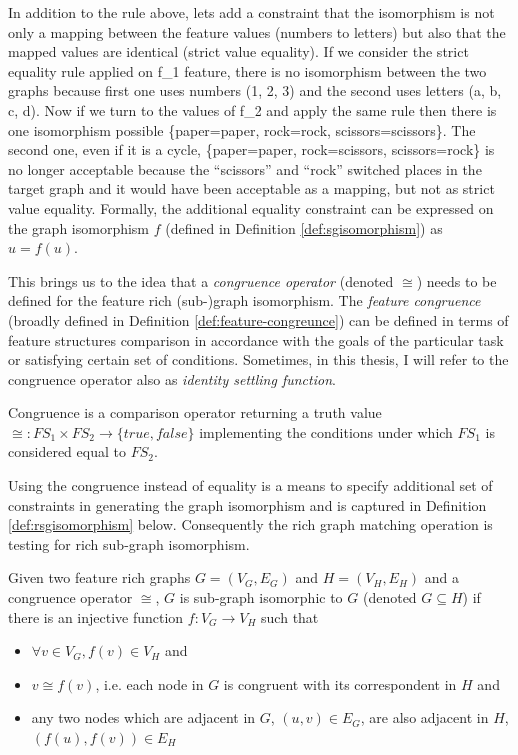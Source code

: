 In addition to the rule above, lets add a constraint that the isomorphism is not only a mapping between the feature values (numbers to letters) but also that the mapped values are identical (strict value equality). 
If we consider the strict equality rule applied on f_1 feature, there is no isomorphism between the two graphs because first one uses numbers (1, 2, 3) and the second uses letters (a, b, c, d). Now if we turn to the values of f_2 and apply the same rule then there is one isomorphism possible \{paper=paper, rock=rock, scissors=scissors\}. The second one, even if it is a cycle, \{paper=paper, rock=scissors, scissors=rock\} is no longer acceptable because the ``scissors'' and ``rock'' switched places in the target graph and it would have been acceptable as a mapping, but not as strict value equality. Formally, the additional equality constraint can be expressed on the graph isomorphism $f$ (defined in Definition \ref{def:sgisomorphism}) as $u=f(u)$.

This brings us to the idea that a \textit{congruence operator} (denoted $\cong$) needs to be defined for the feature rich (sub-)graph isomorphism. The \textit{feature congruence} (broadly defined in Definition \ref{def:feature-congreunce}) can be defined in terms of feature structures comparison in accordance with the goals of the particular task or satisfying certain set of conditions. Sometimes, in this thesis, I will refer to the congruence operator also as \textit{identity settling function}. 

\begin{definition}[Congruence]\label{def:feature-congreunce}
    Congruence is a comparison operator returning a truth value $\cong: 
    FS_1 \times FS_2 \rightarrow \{true, false\}$ implementing the conditions under which $FS_1$ is considered equal to $FS_2$.
\end{definition}

Using the congruence instead of equality is a means to specify additional set of constraints in generating the graph isomorphism and is captured in Definition \ref{def:rsgisomorphism} below. Consequently the rich graph matching operation is testing for rich sub-graph isomorphism. 

\begin{definition}\label{def:rsgisomorphism}
    Given two feature rich graphs $G=(V_G,E_G)$ and $H=(V_H,E_H)$ and a congruence operator $\cong$, $G$ is sub-graph isomorphic to $G$ (denoted $G \subseteq H$) if there is an injective function $f:V_G \rightarrow V_H$ such that
    \begin{itemize}
        \item $\forall v \in V_G, f(v) \in V_H$ and
        \item $v \cong f(v)$, i.e. each node in $G$ is congruent with its correspondent in $H$ and
        \item any two nodes which are adjacent in $G$, $(u,v) \in E_G$, are also adjacent in $H$, $(f(u), f(v)) \in E_H $
    \end{itemize}
\end{definition}


